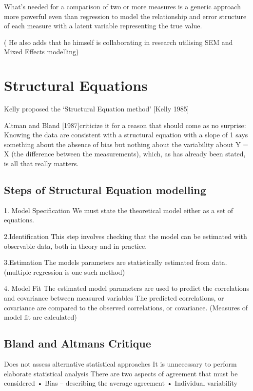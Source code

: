 \documentclass[12pt, a4paper]{report}
\theoremstyle{plain}
\theoremstyle{definition}
\theoremstyle{remark}
\begin{document}
What's needed for a comparison of two or more measures is a generic approach more powerful even than regression to model the relationship and error structure of each measure with a latent variable representing the true value.  

( He also adds that he himself is collaborating in research utilising SEM and Mixed Effects modelling)
\section{Structural Equations}

Kelly proposed the ‘Structural Equation method’ [Kelly 1985]

Altman and Bland [1987]criticize it for a reason that should come as no surprise: 
Knowing the data are consistent with a structural equation with a slope of 1 says something 
about the absence of bias but nothing about the variability about Y = X (the difference between the measurements), which, as has already been stated, is all that really matters.

\subsection{Steps of Structural Equation modelling}

1. Model Specification
We must state the theoretical model either as a set of equations.

2.Identification 
This step involves checking that the model can be estimated with observable data, both in theory and in practice.

3.Estimation
The models parameters are statistically estimated from data. (multiple regression is one such method)

4. Model Fit
The estimated model parameters are used to predict the correlations and covariance between measured variables 
The predicted correlations, or covariance are compared to the observed correlations, or covariance. (Measures of model fit are calculated)

\subsection{Bland and Altmans Critique}

Does not assess alternative statistical approaches
It is unnecessary to perform elaborate statistical analysis
There are two aspects of agreement that must be considered
•	Bias – describing the average agreement
•	Individual variability
\end{document}
